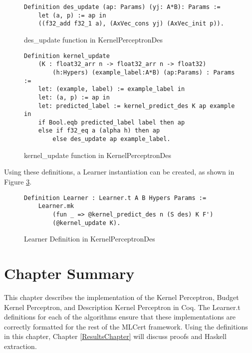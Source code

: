 \begin{figure}
    \caption{des\_update function in KernelPerceptronDes}
    \label{des_updateDef}
    \begin{lstlisting}
Definition des_update (ap: Params) (yj: A*B): Params :=      
    let (a, p) := ap in
    ((f32_add f32_1 a), (AxVec_cons yj) (AxVec_init p)).
    \end{lstlisting}
\end{figure}

\begin{figure}
    \caption{kernel\_update function in KernelPerceptronDes}
    \label{kernel_update_desDef}
    \begin{lstlisting}
Definition kernel_update 
    (K : float32_arr n -> float32_arr n -> float32)
        (h:Hypers) (example_label:A*B) (ap:Params) : Params :=
    let: (example, label) := example_label in
    let: (a, p) := ap in 
    let: predicted_label := kernel_predict_des K ap example in
    if Bool.eqb predicted_label label then ap
    else if f32_eq a (alpha h) then ap
        else des_update ap example_label.
    \end{lstlisting}
\end{figure}

Using these definitions, a Learner instantiation can be created, as shown in Figure \ref{kpdLearnerDef}.

\begin{figure}
    \caption{Learner Definition in KernelPerceptronDes}
    \label{kpdLearnerDef}
    \begin{lstlisting}
Definition Learner : Learner.t A B Hypers Params :=
    Learner.mk
        (fun _ => @kernel_predict_des n (S des) K F')
        (@kernel_update K).
    \end{lstlisting}
\end{figure}

\section{Chapter Summary}\label{MethodsChapterSummarySection}
This chapter describes the implementation of the Kernel Perceptron, Budget Kernel Perceptron, and Description Kernel Perceptron in Coq. The Learner.t definitions for each of the algorithms ensure that these implementations are correctly formatted for the rest of the MLCert framework. Using the definitions in this chapter, Chapter \ref{ResultsChapter} will discuss proofs and Haskell extraction. 
